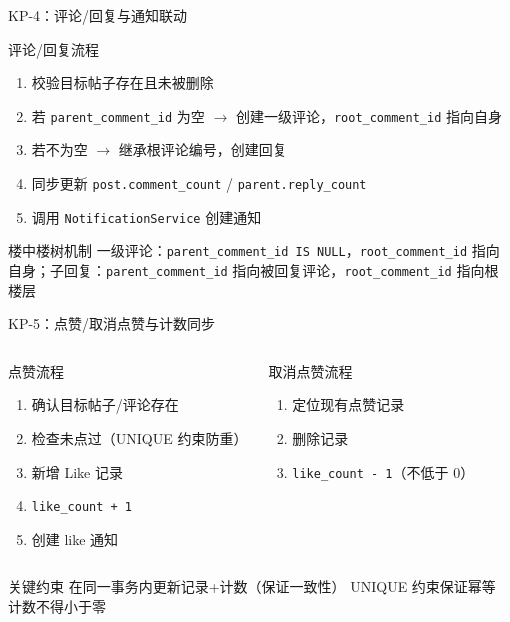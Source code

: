 \documentclass[aspectratio=169,UTF8]{ctexbeamer}
\begin{document}
\begin{frame}{KP-4：评论/回复与通知联动}
    \begin{block}{评论/回复流程}
        \begin{enumerate}
            \item 校验目标帖子存在且未被删除
            \item 若 \texttt{parent\_comment\_id} 为空 $\rightarrow$ 创建一级评论，\texttt{root\_comment\_id} 指向自身
            \item 若不为空 $\rightarrow$ 继承根评论编号，创建回复
            \item 同步更新 \texttt{post.comment\_count} / \texttt{parent.reply\_count}
            \item 调用 \texttt{NotificationService} 创建通知
        \end{enumerate}
    \end{block}
    \begin{exampleblock}{楼中楼树机制}
        一级评论：\texttt{parent\_comment\_id IS NULL}，\texttt{root\_comment\_id} 指向自身；子回复：\texttt{parent\_comment\_id} 指向被回复评论，\texttt{root\_comment\_id} 指向根楼层
    \end{exampleblock}
\end{frame}

\begin{frame}{KP-5：点赞/取消点赞与计数同步}
    \begin{columns}[T]
        \begin{block}{点赞流程}
            \begin{enumerate}
                \item 确认目标帖子/评论存在
                \item 检查未点过（UNIQUE 约束防重）
                \item 新增 Like 记录
                \item \texttt{like\_count + 1}
                \item 创建 like 通知
            \end{enumerate}
        \end{block}
        \begin{block}{取消点赞流程}
            \begin{enumerate}
                \item 定位现有点赞记录
                \item 删除记录
                \item \texttt{like\_count - 1}（不低于 0）
            \end{enumerate}
        \end{block}
    \end{columns}
    \vspace{0.2cm}
    \begin{alertblock}{关键约束}
        在同一事务内更新记录+计数（保证一致性）\textbullet{} UNIQUE 约束保证幂等 \textbullet{} 计数不得小于零
    \end{alertblock}
\end{frame}
\end{document}
